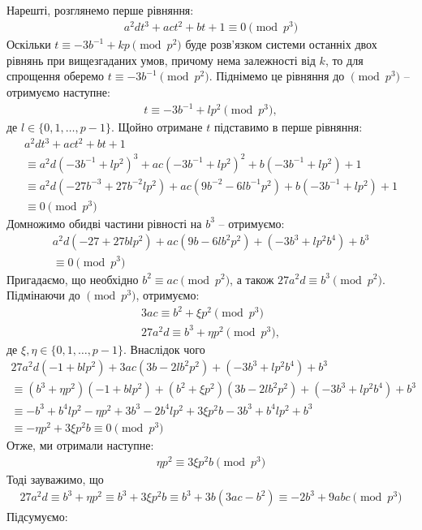 \documentclass{thesis}
\begin{document}
Нарешті, розглянемо перше рівняння:
\begin{align*}
a^2 dt^3 + act^2 + bt + 1 \equiv 0 \pmod {p^3}
\end{align*}
Оскільки $t \equiv -3b^{-1} + kp \pmod {p^2}$ буде розв'язком системи останніх двох рівнянь при вищезгаданих умов, причому нема залежності від $k$, то для спрощення оберемо $t \equiv -3b^{-1} \pmod {p^2}$. Піднімемо це рівняння до $\pmod {p^3}$ -- отримуємо наступне:
\begin{align*}
t \equiv -3b^{-1} + lp^2 \pmod {p^3},
\end{align*} 
де $l \in \{0,1,\dots,p-1\}$. Щойно отримане $t$ підставимо в перше рівняння:
\begin{multline*}
a^2 dt^3 + act^2 + bt + 1 \\ 
\equiv a^2 d (-3b^{-1} + lp^2)^3 + ac(-3b^{-1} + lp^2)^2 + b(-3b^{-1} + lp^2) + 1 \\
\equiv a^2d (-27b^{-3} + 27b^{-2} lp^2) + ac (9b^{-2} - 6 l b^{-1} p^2) + b (-3b^{-1} + lp^2) + 1 \\ 
\equiv 0 \pmod {p^3}
\end{multline*}
Домножимо обидві частини рівності на $b^3$ -- отримуємо:
\begin{multline*}
a^2d (-27 + 27b lp^2) + ac (9b - 6 l b^2 p^2) + (-3 b^3 + lp^2 b^4) + b^3 \\ 
\equiv 0 \pmod {p^3}
\end{multline*}
Пригадаємо, що необхідно $b^2 \equiv ac \pmod {p^2}$, а також $27a^2 d \equiv b^3 \pmod {p^2}$. Підмінаючи до $\pmod {p^3}$, отримуємо:
\begin{align*}
3ac \equiv b^2 + \xi p^2 \pmod {p^3} \\
27a^2 d \equiv b^3 + \eta p^2 \pmod {p^3},
\end{align*}
де $\xi,\eta \in \{0,1,\dots,p-1\}$. Внаслідок чого
\begin{multline*}
27 a^2d (-1+ b lp^2) + 3ac (3b - 2 l b^2 p^2) + (-3 b^3 + lp^2 b^4) + b^3 \\ \equiv (b^3 + \eta p^2)(-1 + b lp^2) + (b^2 + \xi p^2)(3b - 2 l b^2 p^2) + (-3 b^3 + lp^2 b^4) + b^3 \\ \equiv -b^3 + b^4 lp^2 - \eta p^2 + 3b^3 - 2b^4 lp^2 + 3 \xi p^2 b - 3b^3 + b^4 lp^2 + b^3 \\
\equiv - \eta p^2 + 3\xi p^2 b \equiv 0 \pmod {p^3}
\end{multline*}
Отже, ми отримали наступне:
\begin{align*}
\eta p^2 \equiv 3 \xi p^2 b \pmod {p^3}
\end{align*}
Тоді зауважимо, що
\begin{align*}
27 a^2 d \equiv b^3 + \eta p^2 \equiv b^3 + 3 \xi p^2 b \equiv b^3 + 3b(3ac - b^2) \equiv -2b^3 + 9abc \pmod {p^3}
\end{align*}
Підсумуємо:
\end{document}
